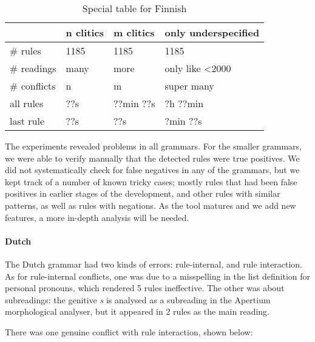 \begin{table}[]
\centering
\begin{tabular}{|l|l|l|l|}

\hline
              & n clitics & m clitics & only underspecified \\ \hline
\# rules      & 1185      & 1185      & 1185\\ \hline
\# readings   & many & more & only like <2000   \\ \hline
\# conflicts  & n   & m        & super many    \\ \hline
\clock{} all rules       & ??s              & ??min ??s    & ?h ??min    \\ \hline
\clock{} last rule       & ??s              & ??s          & ?min ??s    \\ \hline


\end{tabular}
\caption{Special table for Finnish}
\label{table:resFin}
\end{table}


The experiments revealed problems in all grammars. For the smaller
grammars, we were able to verify manually that the detected rules were
true positives.
We did not systematically check for false negatives in any of the
grammars, but we kept track of a number of known tricky cases; mostly
rules that had been false positives in earlier stages of the
development, and other rules with similar patterns, as well as rules
with negations.
As the tool matures and we add
new features, a more in-depth analysis will be needed.

\paragraph{Dutch} The Dutch grammar had two kinds of errors: rule-internal, and rule interaction. As for rule-internal conflicts, one was due to a misspelling in the list definition for personal pronouns, which rendered 5 rules ineffective. The other was about subreadings: the genitive \emph{s} is analysed as a subreading in the Apertium morphological analyser, but it appeared in 2 rules as the main reading. 

There was one genuine conflict with rule interaction, shown below:

